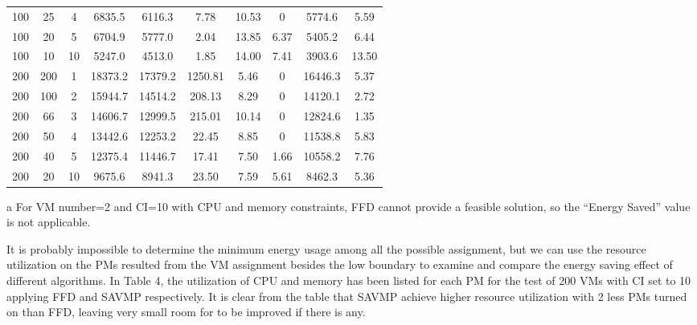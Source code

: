 \documentclass[10pt, conference, compsocconf]{IEEEtran}
\begin{document}
\begin{table*}[t]
\begin{center}
\begin{threeparttable}
\begin{tabular}{c|c|c|c|c|c|c|c|c|c}
100 &25 & 4 & 6835.5 & 6116.3 & 7.78 & 10.53 & 0 & 5774.6 & 5.59\\
100 &20 & 5 & 6704.9 & 5777.0 & 2.04 & 13.85 & 6.37 & 5405.2 & 6.44\\
100 &10 & 10 & 5247.0 & 4513.0 & 1.85 & 14.00 & 7.41 & 3903.6 & 13.50\\
\hline
200 &200 & 1 & 18373.2 & 17379.2 & 1250.81 & 5.46 & 0 & 16446.3 & 5.37\\
200 &100 & 2 & 15944.7 & 14514.2 & 208.13 & 8.29 & 0 & 14120.1 & 2.72\\
200 &66  & 3 & 14606.7 & 12999.5 & 215.01 & 10.14 & 0 & 12824.6 & 1.35\\
200 &50  & 4 & 13442.6 & 12253.2 & 22.45 & 8.85 & 0 & 11538.8 & 5.83\\
200 &40  & 5 & 12375.4 & 11446.7 & 17.41 & 7.50 & 1.66 & 10558.2 & 7.76\\
200 &20  & 10 & 9675.6 & 8941.3 & 23.50 & 7.59 & 5.61 & 8462.3 & 5.36\\
\hline\hline
\end{tabular}
\begin{tablenotes}
\item [a] For VM number=2 and CI=10 with CPU and memory constraints, FFD cannot
provide a feasible solution, so the ``Energy Saved'' value is not applicable.
\end{tablenotes}
\end{threeparttable}

\end{center}
\end{table*}



It is probably impossible to determine the minimum energy usage among all the
possible assignment, but we can use the resource utilization on the PMs resulted from the
VM assignment besides the low boundary to examine and compare the energy saving
effect of different algorithms. In Table 4, the utilization of CPU and memory
has been listed for each PM for the test of 200 VMs with CI set to 10 applying FFD and
SAVMP respectively. It is clear from the table that SAVMP achieve higher
resource utilization with 2 less PMs turned on than FFD, leaving very small
room for to be improved if there is any.
\end{document}
